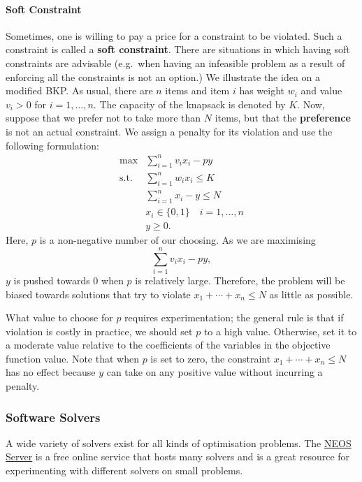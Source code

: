 \paragraph{Soft Constraint}

Sometimes, one is willing to pay a price for a constraint to be
violated. Such a constraint is called a \textbf{soft constraint}. There
are situations in which having soft constraints are advisable (e.g.~when
having an infeasible problem as a result of enforcing all the
constraints is not an option.) We illustrate the idea on a modified
BKP. As usual, there are \(n\) items and item \(i\)
has weight \(w_i\) and value \(v_i>0\) for \(i = 1,\ldots, n\). The
capacity of the knapsack is denoted by \(K\). Now, suppose that we prefer not to take more than \(N\)
items,  but that the \textbf{preference} is not an actual constraint. We assign a penalty for its violation and use the following formulation:
\[\begin{array}{rl}
\max & \sum\limits_{i = 1}^n v_i x_i - p y\\
\mbox{s.t.} & \sum\limits_{i = 1}^n w_i x_i \leq K \\
  & \sum\limits_{i = 1}^n x_i - y \leq N \\
  & x_i \in \{0,1\} \quad i = 1,\ldots, n \\
  & y \geq 0.
\end{array}\] Here, \(p\) is a non-negative number of our choosing. As we
are maximising $$\sum\limits_{i = 1}^n v_i x_i - p y,$$ \(y\) is pushed
towards 0 when \(p\) is relatively large. Therefore, the problem will be
biased towards solutions that try to violate
$x_1+\cdots+x_n \leq N$ as little as possible.\par  What value to
choose for \(p\) requires experimentation; the general rule is that if
violation is costly in practice, we should set \(p\) to a high value. Otherwise, set it to a
moderate value relative to the coefficients of the variables in the
objective function value. Note that when \(p\) is set to zero, the
constraint $x_1+\cdots+x_n \leq N$ has no effect
because \(y\) can take on any positive value without incurring a
penalty.


\subsubsection{Software Solvers}

A wide variety of solvers exist for all kinds of optimisation problems.
The \href{https://neos-server.org/neos/}{NEOS Server} is a free online
service that hosts many solvers and is a great resource for
experimenting with different solvers on small problems.

